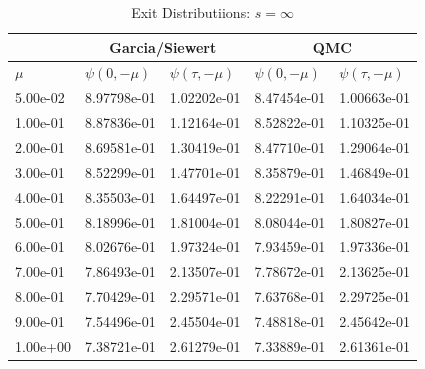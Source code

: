 \begin{table}
\centering
\caption{Exit Distributiions: $s = \infty$}
\label{tab:cesinf}
\begin{tabular}{lllll}
 & \multicolumn{2}{c}{Garcia/Siewert}
 & \multicolumn{2}{c}{QMC}\\
\hline
    $\mu$ &$\psi(0, -\mu)$ &$\psi(\tau, -\mu)$ &$\psi(0, -\mu)$ &$\psi(\tau, -\mu)$ \\
\hline
5.00e-02 &  8.97798e-01 &  1.02202e-01 &  8.47454e-01 &  1.00663e-01   \\
1.00e-01 &  8.87836e-01 &  1.12164e-01 &  8.52822e-01 &  1.10325e-01   \\
2.00e-01 &  8.69581e-01 &  1.30419e-01 &  8.47710e-01 &  1.29064e-01   \\
3.00e-01 &  8.52299e-01 &  1.47701e-01 &  8.35879e-01 &  1.46849e-01   \\
4.00e-01 &  8.35503e-01 &  1.64497e-01 &  8.22291e-01 &  1.64034e-01   \\
5.00e-01 &  8.18996e-01 &  1.81004e-01 &  8.08044e-01 &  1.80827e-01   \\
6.00e-01 &  8.02676e-01 &  1.97324e-01 &  7.93459e-01 &  1.97336e-01   \\
7.00e-01 &  7.86493e-01 &  2.13507e-01 &  7.78672e-01 &  2.13625e-01   \\
8.00e-01 &  7.70429e-01 &  2.29571e-01 &  7.63768e-01 &  2.29725e-01   \\
9.00e-01 &  7.54496e-01 &  2.45504e-01 &  7.48818e-01 &  2.45642e-01   \\
1.00e+00 &  7.38721e-01 &  2.61279e-01 &  7.33889e-01 &  2.61361e-01   \\
\hline
\end{tabular}
\end{table}

